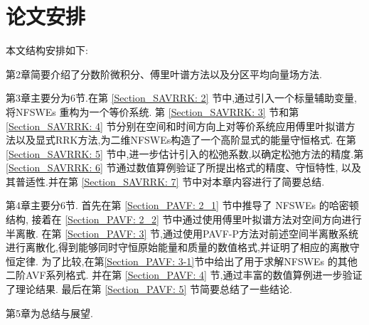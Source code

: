 \section{论文安排}
本文结构安排如下:

第2章简要介绍了分数阶微积分、傅里叶谱方法以及分区平均向量场方法.

第3章主要分为6节.在第 \ref{Section_SAVRRK: 2} 节中,通过引入一个标量辅助变量,将NFSWEs  重构为一个等价系统.
第 \ref{Section_SAVRRK: 3} 节和第 \ref{Section_SAVRRK: 4} 节分别在空间和时间方向上对等价系统应用傅里叶拟谱方法以及显式RRK方法,为二维NFSWEs构造了一个高阶显式的能量守恒格式.
在第 \ref{Section_SAVRRK: 5} 节中,进一步估计引入的松弛系数,以确定松弛方法的精度.第 \ref{Section_SAVRRK: 6} 节通过数值算例验证了所提出格式的精度、守恒特性,
以及其普适性.并在第 \ref{Section_SAVRRK: 7} 节中对本章内容进行了简要总结.

第4章主要分6节. 首先在第 \ref{Section_PAVF: 2_1} 节中推导了 NFSWEs 的哈密顿结构, 接着在 \ref{Section_PAVF: 2_2} 节中通过使用傅里叶拟谱方法对空间方向进行半离散.
在第 \ref{Section_PAVF: 3} 节,通过使用PAVF-P方法对前述空间半离散系统进行离散化,得到能够同时守恒原始能量和质量的数值格式,并证明了相应的离散守恒定律.
为了比较,在第\ref{Section_PAVF: 3-1}节中给出了用于求解NFSWEs  的其他二阶AVF系列格式.
并在第 \ref{Section_PAVF: 4} 节,通过丰富的数值算例进一步验证了理论结果.
最后在第 \ref{Section_PAVF: 5} 节简要总结了一些结论.

第5章为总结与展望.